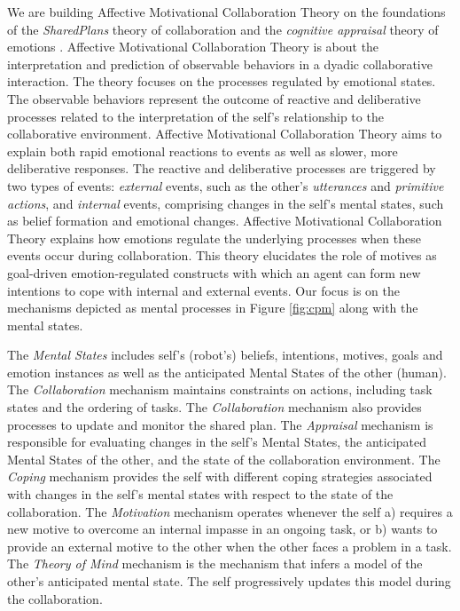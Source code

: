 \documentclass[letterpaper]{article}
\begin{document}
We are building Affective Motivational Collaboration Theory on the foundations
of the \textit{SharedPlans} theory of collaboration \cite{grosz:plans-discourse}
and the \textit{cognitive appraisal} theory of emotions
\cite{gratch:domain-independent}. Affective Motivational Collaboration Theory is
about the interpretation and prediction of observable behaviors in a dyadic
collaborative interaction. The theory focuses on the processes regulated by
emotional states. The observable behaviors represent the outcome of reactive and
deliberative processes related to the interpretation of the self's relationship
to the collaborative environment. Affective Motivational Collaboration Theory
aims to explain both rapid emotional reactions to events as well as slower, more
deliberative responses. The reactive and deliberative processes are triggered by
two types of events: \textit{external} events, such as the other's
\textit{utterances} and \textit{primitive actions}, and \textit{internal}
events, comprising changes in the self's mental states, such as belief formation
and emotional changes. Affective Motivational Collaboration Theory explains how
emotions regulate the underlying processes when these events occur during
collaboration. This theory elucidates the role of motives as goal-driven
emotion-regulated constructs with which an agent can form new intentions to cope
with internal and external events. Our focus is on the mechanisms depicted as
mental processes in Figure \ref{fig:cpm} along with the mental states. 

The \textit{Mental States} includes self's (robot's) beliefs, intentions,
motives, goals and emotion instances as well as the anticipated Mental States of
the other (human). The \textit{Collaboration} mechanism maintains constraints on
actions, including task states and the ordering of tasks. The
\textit{Collaboration} mechanism also provides processes to update and monitor
the shared plan. The \textit{Appraisal} mechanism is responsible for evaluating
changes in the self's Mental States, the anticipated Mental States of the other,
and the state of the collaboration environment. The \textit{Coping} mechanism
provides the self with different coping strategies associated with changes in
the self's mental states with respect to the state of the collaboration. The
\textit{Motivation} mechanism operates whenever the self a) requires a new
motive to overcome an internal impasse in an ongoing task, or b) wants to
provide an external motive to the other when the other faces a problem in a
task. The \textit{Theory of Mind} mechanism is the mechanism that infers a model
of the other's anticipated mental state. The self progressively updates this
model during the collaboration.
\end{document}
